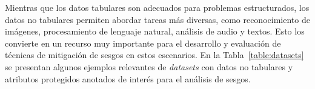    Mientras que los datos tabulares son adecuados para problemas estructurados, los datos no tabulares permiten abordar tareas m\'as diversas, 
    como reconocimiento de im\'agenes, procesamiento de lenguaje natural, an\'alisis de audio y textos. Esto los convierte en un recurso muy importante
    para el desarrollo y evaluaci\'on de t\'ecnicas de mitigaci\'on de sesgos en estos escenarios. En la Tabla~\ref{table:datasets} 
    se presentan algunos ejemplos relevantes de \emph{datasets} con datos no tabulares y atributos protegidos anotados de inter\'es para el 
    an\'alisis de sesgos.

    \begin{table}[htpb]
        \centering
\end{table}
